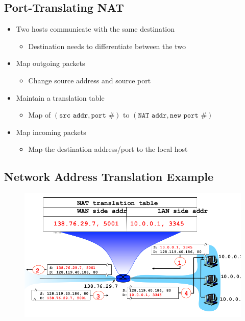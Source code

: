 \subsection{Port-Translating NAT}
\begin{itemize}
    \item Two hosts communicate with the same destination
          \begin{itemize}
              \item Destination needs to differentiate between the two
          \end{itemize}
    \item Map outgoing packets
          \begin{itemize}
              \item Change source address and source port
          \end{itemize}
    \item Maintain a translation table
          \begin{itemize}
              \item Map of $(\texttt{src addr}, \texttt{port \#})$ to $(\texttt{NAT addr}, \texttt{new port \#})$
          \end{itemize}
    \item Map incoming packets
          \begin{itemize}
              \item Map the destination address/port to the local host
          \end{itemize}
\end{itemize}

\subsection{Network Address Translation Example}
\begin{figure}[H]
    \includegraphics[scale=0.5]{lazy/network-address-translation.png}
\end{figure}

